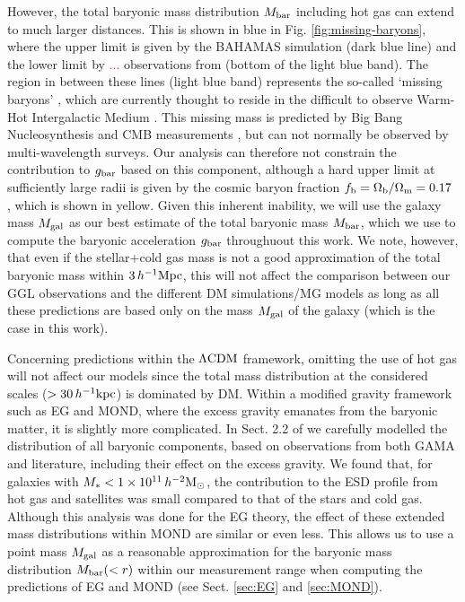 \documentclass[usenatbib]{mnras}
\newcommand{\hmsun}{\,h^{-2} {\rm M_\odot}}
\newcommand{\hkpc}{\, h^{-1}{\rm{kpc}} }
\newcommand{\hMpc}{\, h^{-1}{\rm{Mpc}} }
\newcommand{\lcdm}{{\rm \Lambda CDM}}
\newcommand*{\E}[1]{\times 10^{#1}}
\newcommand{\un}[1]{_{\rm #1}}
\begin{document}
However, the total baryonic mass distribution $M\un{bar}$ including hot gas can extend to much larger distances. This is shown in blue in Fig. \ref{fig:missing-baryons}, where the upper limit is given by the BAHAMAS simulation (dark blue line) and the lower limit by \textcolor{red}{...} observations from \cite{tumlinson2017} (bottom of the light blue band). The region in between these lines (light blue band) represents the so-called `missing baryons' \cite[]{fukugita1998,fukugita2004,shull2012}, which are currently thought to reside in the difficult to observe Warm-Hot Intergalactic Medium \cite[WHIM,][]{nicastro2018}. This missing mass is predicted by Big Bang Nucleosynthesis \cite[BBN,][]{kirkman2003} and CMB measurements \cite[]{spergel2003,planck2014}, but can not normally be observed by multi-wavelength surveys. Our analysis can therefore not constrain the contribution to $g\un{bar}$ based on this component, although a hard upper limit at sufficiently large radii is given by the cosmic baryon fraction $f\un{b} = \Omega\un{b}/\Omega\un{m} = 0.17$ \cite[]{hinshaw2013}, which is shown in yellow. Given this inherent inability, we will use the galaxy mass $M\un{gal}$ as our best estimate of the total baryonic mass $M\un{bar}$, which we use to compute the baryonic acceleration $g\un{bar}$ throughuout this work. We note, however, that even if the stellar+cold gas mass is not a good approximation of the total baryonic mass within $3 \hMpc$, this will not affect the comparison between our GGL observations and the different DM simulations/MG models as long as all these predictions are based only on the mass $M\un{gal}$ of the galaxy (which is the case in this work).

Concerning predictions within the $\lcdm$ framework, omitting the use of hot gas will not affect our models since the total mass distribution at the considered scales ($>30\hkpc$) is dominated by DM. Within a modified gravity framework such as EG and MOND, where the excess gravity emanates from the baryonic matter, it is slightly more complicated. In Sect. 2.2 of \cite{brouwer2016} we carefully modelled the distribution of all baryonic components, based on observations from both GAMA and literature, including their effect on the excess gravity. We found that, for galaxies with $M_*<1\E{11}\hmsun$, the contribution to the ESD profile from hot gas and satellites was small compared to that of the stars and cold gas. Although this analysis was done for the EG theory, the effect of these extended mass distributions within MOND are similar or even less. This allows us to use a point mass $M\un{gal}$ as a reasonable approximation for the baryonic mass distribution $M\un{bar}(<r)$ within our measurement range when computing the predictions of EG and MOND (see Sect. \ref{sec:EG} and \ref{sec:MOND}).
\end{document}
